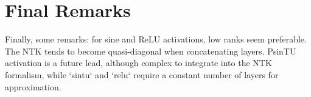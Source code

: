 \documentclass{article}
\begin{document}
\section{Final Remarks}
Finally, some remarks: for sine and ReLU activations, low ranks seem preferable. The NTK tends to become quasi-diagonal when concatenating layers. PsinTU activation is a future lead, although complex to integrate into the NTK formalism, while `sintu` and `relu` require a constant number of layers for approximation.
\end{document}
